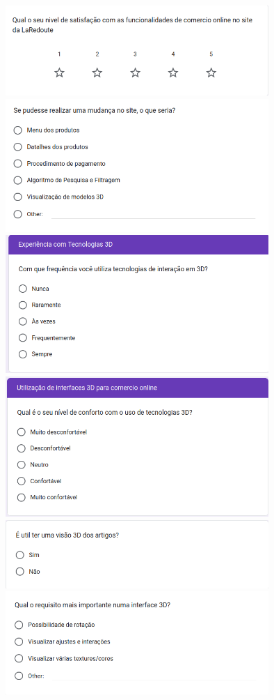 \documentclass[a4paper,12pt]{article}
\begin{document}
\begin{center}
    \includegraphics[width=0.75\textwidth]{form/15questao_satisfacao.png}
    \includegraphics[width=0.75\textwidth]{form/16questao_mudancasite.png}
    \includegraphics[width=0.75\textwidth]{form/17questao_frequencia3d.png}
    \includegraphics[width=0.75\textwidth]{form/18questao_conforto3d.png}
    \includegraphics[width=0.75\textwidth]{form/19questao_visao3d.png}
    \includegraphics[width=0.75\textwidth]{form/20questao_requisito3d.png}
\end{center}
\end{document}
